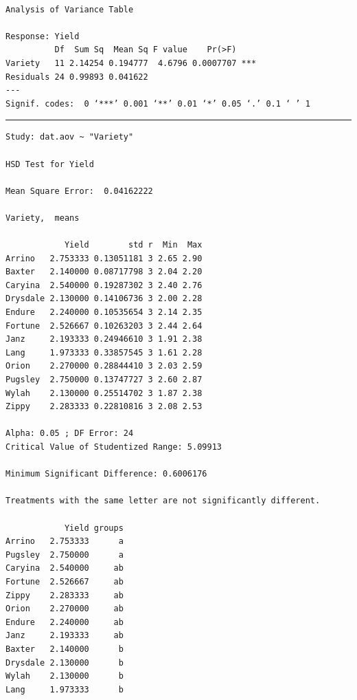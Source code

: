 \documentclass[a4paper, 10pt, fleqn, twosided]{memoir}
\begin{document}
\begin{tcolorbox}[title = Exercise 1 output continued]
\begin{verbatim}

Analysis of Variance Table

Response: Yield
          Df  Sum Sq  Mean Sq F value    Pr(>F)
Variety   11 2.14254 0.194777  4.6796 0.0007707 ***
Residuals 24 0.99893 0.041622
---
Signif. codes:  0 ‘***’ 0.001 ‘**’ 0.01 ‘*’ 0.05 ‘.’ 0.1 ‘ ’ 1

\end{verbatim}
{\color{outpt} {\hrule height 1pt}}
\begin{verbatim}
Study: dat.aov ~ "Variety"

HSD Test for Yield

Mean Square Error:  0.04162222

Variety,  means

            Yield        std r  Min  Max
Arrino   2.753333 0.13051181 3 2.65 2.90
Baxter   2.140000 0.08717798 3 2.04 2.20
Caryina  2.540000 0.19287302 3 2.40 2.76
Drysdale 2.130000 0.14106736 3 2.00 2.28
Endure   2.240000 0.10535654 3 2.14 2.35
Fortune  2.526667 0.10263203 3 2.44 2.64
Janz     2.193333 0.24946610 3 1.91 2.38
Lang     1.973333 0.33857545 3 1.61 2.28
Orion    2.270000 0.28844410 3 2.03 2.59
Pugsley  2.750000 0.13747727 3 2.60 2.87
Wylah    2.130000 0.25514702 3 1.87 2.38
Zippy    2.283333 0.22810816 3 2.08 2.53

Alpha: 0.05 ; DF Error: 24
Critical Value of Studentized Range: 5.09913

Minimum Significant Difference: 0.6006176

Treatments with the same letter are not significantly different.

            Yield groups
Arrino   2.753333      a
Pugsley  2.750000      a
Caryina  2.540000     ab
Fortune  2.526667     ab
Zippy    2.283333     ab
Orion    2.270000     ab
Endure   2.240000     ab
Janz     2.193333     ab
Baxter   2.140000      b
Drysdale 2.130000      b
Wylah    2.130000      b
Lang     1.973333      b
\end{verbatim}
\end{tcolorbox}
\end{document}
